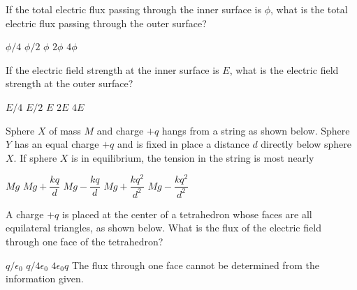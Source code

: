 \documentclass[12pt]{../../../oss-classkick-exam}
\begin{document}
\begin{questions}
  \question If the total electric flux passing through the inner surface is
  $\phi$, what is the total electric flux passing through the outer surface?
  \begin{choices}
    \choice $\phi/4$
    \choice $\phi/2$
    \choice $\phi$
    \choice $2\phi$
    \choice $4\phi$
  \end{choices}
  \label{sphere1}
  
  \question If the electric field strength at the inner surface is $E$, what is
  the electric field strength at the outer surface?
  \begin{choices}
    \choice $E/4$
    \choice $E/2$
    \choice $E$
    \choice $2E$
    \choice $4E$
  \end{choices}
  \label{sphere2}
  
  \uplevel{\rule{\linewidth}{.5pt}}
  
  \question Sphere $X$ of mass $M$ and charge $+q$ hangs from a string as shown
  below. Sphere $Y$ has an equal charge $+q$ and is fixed in place a distance
  $d$ directly below sphere $X$. If sphere $X$ is in equilibrium, the tension
  in the string is most nearly

  \begin{minipage}{.35\linewidth}
  \end{minipage}
  \begin{minipage}{.5\linewidth}
    \begin{choices}
      \choice$Mg$
      \choice$Mg+\dfrac{kq}d$
      \choice$Mg-\dfrac{kq}d$
      \choice$Mg+\dfrac{kq^2}{d^2}$
      \choice$Mg-\dfrac{kq^2}{d^2}$
    \end{choices}
  \end{minipage}

  \uplevel{\rule{\linewidth}{.5pt}}
  
  \question A charge $+q$ is placed at the center of a tetrahedron whose faces
  are all equilateral triangles, as shown below. What is the flux of the
  electric field through one face of the tetrahedron?

  \begin{minipage}{.3\linewidth}
  \end{minipage}
  \begin{minipage}{.69\linewidth}
    \begin{choices}
      \choice$q/\epsilon_0$
      \choice$q/4\epsilon_0$
      \choice$4\epsilon_0q$
      \choice The flux through one face cannot be determined from the
      information given.
    \end{choices}
  \end{minipage}
  \newpage
  

\end{questions}
\end{document}
